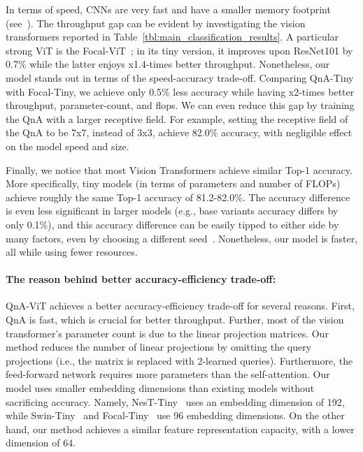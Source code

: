 In terms of speed, CNNs are very fast and have a smaller memory footprint (see~). The throughput gap can be evident by investigating the vision transformers reported in Table~\ref{tbl:main_classification_results}. A particular strong ViT is the Focal-ViT~\cite{FocalViT}; in its tiny version, it improves upon ResNet101 by 0.7\% while the latter enjoys x1.4-times better throughput. Nonetheless, our model stands out in terms of the speed-accuracy trade-off. Comparing QnA-Tiny with Focal-Tiny, we achieve only 0.5\% less accuracy while having x2-times better throughput, parameter-count, and flops. We can even reduce this gap by training the QnA with a larger receptive field. For example, setting the receptive field of the QnA to be 7x7, instead of 3x3, achieve 82.0\% accuracy, with negligible effect on the model speed and size. 

Finally, we notice that most Vision Transformers achieve similar Top-1 accuracy. More specifically, tiny models (in terms of parameters and number of FLOPs) achieve roughly the same Top-1 accuracy of 81.2-82.0\%. The accuracy difference is even less significant in larger models (e.g., base variants accuracy differs by only 0.1\%), and this accuracy difference can be easily tipped to either side by many factors, even by choosing a different seed~\cite{Seed}. Nonetheless, our model is faster, all while using fewer resources. 

\paragraph{The reason behind better accuracy-efficiency trade-off:} QnA-ViT achieves a better accuracy-efficiency trade-off for several reasons. First, QnA is fast, which is crucial for better throughput. Further, most of the vision transformer's parameter count is due to the linear projection matrices. Our method reduces the number of linear projections by omitting the query projections (i.e., the  matrix is replaced with 2-learned queries). Furthermore, the feed-forward network requires  more parameters than the self-attention. Our model uses smaller embedding dimensions than existing models without sacrificing accuracy. Namely, NesT-Tiny~\cite{NestT} uses an embedding dimension of 192, while Swin-Tiny~\cite{Swin} and Focal-Tiny~\cite{FocalViT} use 96 embedding dimensions. On the other hand, our method achieves a similar feature representation capacity, with a lower dimension of 64.

